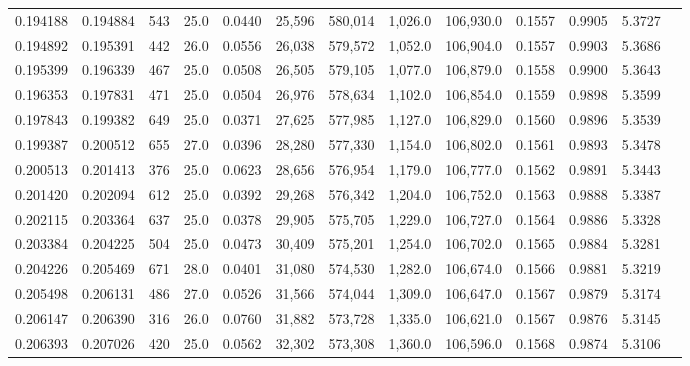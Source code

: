 \begin{tabular}{rrrrrrrrrrrrr}
0.194188 & 0.194884 &   543 & 25.0 &                                     0.0440 &  25,596 & 580,014 &   1,026.0 & 106,930.0 & 0.1557 & 0.9905 & 5.3727 \\
0.194892 & 0.195391 &   442 & 26.0 &                                     0.0556 &  26,038 & 579,572 &   1,052.0 & 106,904.0 & 0.1557 & 0.9903 & 5.3686 \\
0.195399 & 0.196339 &   467 & 25.0 &                                     0.0508 &  26,505 & 579,105 &   1,077.0 & 106,879.0 & 0.1558 & 0.9900 & 5.3643 \\
0.196353 & 0.197831 &   471 & 25.0 &                                     0.0504 &  26,976 & 578,634 &   1,102.0 & 106,854.0 & 0.1559 & 0.9898 & 5.3599 \\
0.197843 & 0.199382 &   649 & 25.0 &                                     0.0371 &  27,625 & 577,985 &   1,127.0 & 106,829.0 & 0.1560 & 0.9896 & 5.3539 \\
0.199387 & 0.200512 &   655 & 27.0 &                                     0.0396 &  28,280 & 577,330 &   1,154.0 & 106,802.0 & 0.1561 & 0.9893 & 5.3478 \\
0.200513 & 0.201413 &   376 & 25.0 &                                     0.0623 &  28,656 & 576,954 &   1,179.0 & 106,777.0 & 0.1562 & 0.9891 & 5.3443 \\
0.201420 & 0.202094 &   612 & 25.0 &                                     0.0392 &  29,268 & 576,342 &   1,204.0 & 106,752.0 & 0.1563 & 0.9888 & 5.3387 \\
0.202115 & 0.203364 &   637 & 25.0 &                                     0.0378 &  29,905 & 575,705 &   1,229.0 & 106,727.0 & 0.1564 & 0.9886 & 5.3328 \\
0.203384 & 0.204225 &   504 & 25.0 &                                     0.0473 &  30,409 & 575,201 &   1,254.0 & 106,702.0 & 0.1565 & 0.9884 & 5.3281 \\
0.204226 & 0.205469 &   671 & 28.0 &                                     0.0401 &  31,080 & 574,530 &   1,282.0 & 106,674.0 & 0.1566 & 0.9881 & 5.3219 \\
0.205498 & 0.206131 &   486 & 27.0 &                                     0.0526 &  31,566 & 574,044 &   1,309.0 & 106,647.0 & 0.1567 & 0.9879 & 5.3174 \\
0.206147 & 0.206390 &   316 & 26.0 &                                     0.0760 &  31,882 & 573,728 &   1,335.0 & 106,621.0 & 0.1567 & 0.9876 & 5.3145 \\
0.206393 & 0.207026 &   420 & 25.0 &                                     0.0562 &  32,302 & 573,308 &   1,360.0 & 106,596.0 & 0.1568 & 0.9874 & 5.3106 \\

\end{tabular}
